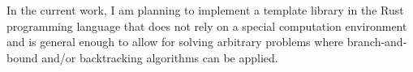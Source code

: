 In the current work, I am planning
to implement a template library in the Rust programming language that does not rely
on a special computation environment and is general enough to allow for solving
arbitrary problems where branch-and-bound and/or backtracking algorithms can be applied.




%
%
%
